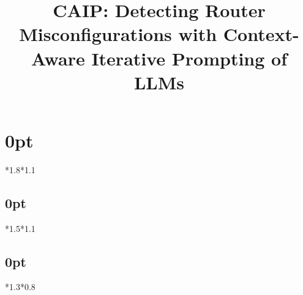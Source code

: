 \usepackage{caption}
\usepackage{ltablex}

\usepackage{ifluatex}

\usepackage{outlines}
\newtheorem{insight}{Insight}

\captionsetup[figure]{belowskip=0pt}
\captionsetup[figure]{skip=0pt}
\captionsetup[table]{belowskip=0pt}
\captionsetup[table]{skip=0pt}


\usepackage[compact]{titlesec}
\renewcommand{\paragraph}[1]{\noindent\textbf{#1}}
\setlength{\textfloatsep}{5pt plus 0pt minus 2.0pt}
\titlespacing\section{0pt}{*1.8}{*1.1}
\titlespacing\subsection{0pt}{*1.5}{*1.1}
\titlespacing\subsection{0pt}{*1.3}{*0.8}
\usepackage{booktabs}



\newcommand*{\affmark}[1][*]{\textsuperscript{#1}}
\newcommand*{\affaddr}[1]{#1}


\title{CAIP: Detecting Router Misconfigurations with Context-Aware Iterative Prompting of LLMs}
\newcommand{\eg}{{\it e.g.}}
\newcommand{\ie}{{\it i.e.}}
\newcommand{\etal}{{\it et al.}}
\newcommand{\sysname}{{CAIP}}


